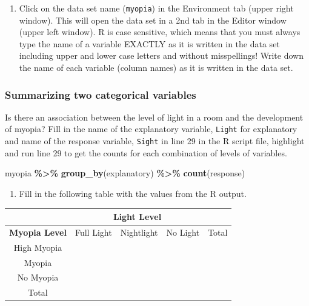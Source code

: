 \documentclass[
]{report}
\newenvironment{Shaded}{\begin{snugshade}}{\end{snugshade}}
\newcommand{\FunctionTok}[1]{\textcolor[rgb]{0.13,0.29,0.53}{\textbf{#1}}}
\newcommand{\NormalTok}[1]{#1}
\newcommand{\SpecialCharTok}[1]{\textcolor[rgb]{0.81,0.36,0.00}{\textbf{#1}}}
\providecommand{\tightlist}{%
  \setlength{\itemsep}{0pt}\setlength{\parskip}{0pt}}
\begin{document}
\begin{enumerate}
\def\labelenumi{\arabic{enumi}.}
\setcounter{enumi}{1}
\tightlist
\item
  Click on the data set name (\texttt{myopia}) in the Environment tab (upper right window). This will open the data set in a 2nd tab in the Editor window (upper left window). R is case sensitive, which means that you must always type the name of a variable EXACTLY as it is written in the data set including upper and lower case letters and without misspellings! Write down the name of each variable (column names) as it is written in the data set.
\end{enumerate}

\vspace{0.3in}

\subsubsection*{Summarizing two categorical variables}\label{summarizing-two-categorical-variables}

Is there an association between the level of light in a room and the development of myopia? Fill in the name of the explanatory variable, \texttt{Light} for explanatory and name of the response variable, \texttt{Sight} in line 29 in the R script file, highlight and run line 29 to get the counts for each combination of levels of variables.

\begin{Shaded}
\begin{Highlighting}[]
\NormalTok{myopia }\SpecialCharTok{\%\textgreater{}\%} \FunctionTok{group\_by}\NormalTok{(explanatory) }\SpecialCharTok{\%\textgreater{}\%} \FunctionTok{count}\NormalTok{(response)}
\end{Highlighting}
\end{Shaded}

\begin{enumerate}
\def\labelenumi{\arabic{enumi}.}
\setcounter{enumi}{2}
\tightlist
\item
  Fill in the following table with the values from the R output.
\end{enumerate}

\begin{center}
\begingroup
\setlength{\tabcolsep}{14pt} %
\renewcommand{\arraystretch}{2} %
\begin{tabular}{|c|c|c|c|c|}
\hline
 & \multicolumn{3}{|c|}{\textbf{Light Level}} & \\ \hline
\textbf{Myopia Level} & Full Light & Nightlight & No Light & Total \\ \hline
 High Myopia & & & & \\ \hline
 Myopia & & & & \\ \hline
 No Myopia & & & & \\ \hline
 Total & & & & \\ \hline  
\end{tabular}
\endgroup
\end{center}
\end{document}
